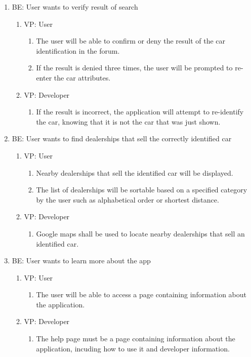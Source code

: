 \documentclass[12pt]{article}
\begin{document}
\begin{enumerate}
	\item BE: User wants to  verify result of search 
	\begin{enumerate}
		\item VP: User
		\begin{enumerate}
			\item The user will be able to confirm or deny the result of the car identification in the forum.
			\item If the result is denied three times, the user will be prompted to re-enter the car attributes.
		\end{enumerate}
		\item VP: Developer
		\begin{enumerate}
			\item If the result is incorrect, the application will attempt to re-identify the car, knowing that it is not the car that was just shown.
		\end{enumerate}
	\end{enumerate}
	
	\item BE: User wants to find dealerships that sell the correctly  identified car
		\begin{enumerate}
		\item VP: User
		\begin{enumerate}
			\item Nearby dealerships that sell the identified car will be displayed.
			\item The list of dealerships will be sortable based on a specified category by the user such as alphabetical order or shortest distance.
		\end{enumerate}
		\item VP: Developer
		\begin{enumerate}
			\item Google maps shall be used to locate nearby dealerships that sell an identified car.
		\end{enumerate}
	\end{enumerate}

	\item BE: User wants to learn more about the app
		\begin{enumerate}
		\item VP: User
		\begin{enumerate}
			\item The user will be able to access a page containing information about the application.
		\end{enumerate}
		\item VP: Developer
		\begin{enumerate}
			\item The help page must be a page containing information about the application, incuding how to use it and developer information.
		\end{enumerate}
	\end{enumerate}


\end{enumerate}
\end{document}
